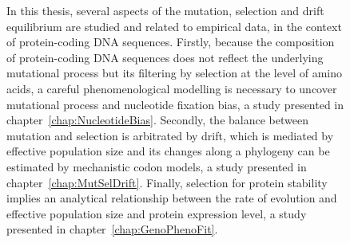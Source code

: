 \begin{figure}[H]
    \centering
    \caption[Goal of the thesis]{
    In this thesis, several aspects of the mutation, selection and drift equilibrium are studied and related to empirical data, in the context of protein-coding \acrshort{DNA} sequences.
    Firstly, because the composition of protein-coding \acrshort{DNA} sequences does not reflect the underlying mutational process but its filtering by selection at the level of amino acids, a careful phenomenological modelling is necessary to uncover mutational process and nucleotide fixation bias, a study presented in chapter~\ref{chap:NucleotideBias}.
    Secondly, the balance between mutation and selection is arbitrated by drift, which is mediated by effective population size and its changes along a phylogeny can be estimated by mechanistic codon models, a study presented in chapter~\ref{chap:MutSelDrift}.
    Finally, selection for protein stability implies an analytical relationship between the rate of evolution and effective population size and protein expression level, a study presented in chapter~\ref{chap:GenoPhenoFit}.
    }
    \label{fig:goals}
\end{figure}

